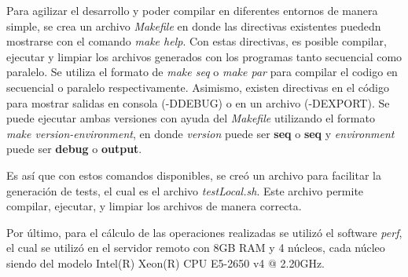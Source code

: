 Para agilizar el desarrollo y poder compilar en diferentes entornos de manera simple, se crea un archivo \textit{Makefile} en donde las directivas existentes puededn mostrarse con el comando \textit{make help}. Con estas directivas, es posible compilar, ejecutar y limpiar los archivos generados con los programas tanto secuencial como paralelo. Se utiliza el formato de \textit{make seq} o \textit{make par} para compilar el codigo en secuencial o paralelo respectivamente. Asimismo, existen directivas en el código para mostrar salidas en consola (-DDEBUG) o en un archivo (-DEXPORT). Se puede ejecutar ambas versiones con ayuda del \textit{Makefile} utilizando el formato \textit{make version-environment}, en donde \textit{version} puede ser \textbf{seq} o \textbf{seq} y \textit{environment} puede ser \textbf{debug} o \textbf{output}. 

Es así que con estos comandos disponibles, se creó un archivo para facilitar la generación de tests, el cual es el archivo \textit{testLocal.sh}. Este archivo permite compilar, ejecutar, y limpiar los archivos de manera correcta.

Por último, para el cálculo de las operaciones realizadas se utilizó el software \textit{perf}, el cual se utilizó en el servidor remoto con 8GB RAM y 4 núcleos, cada núcleo siendo del modelo Intel(R) Xeon(R) CPU E5-2650 v4 @ 2.20GHz. 